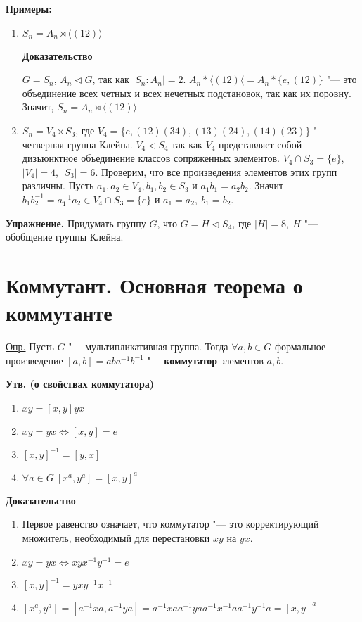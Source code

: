 \documentclass{article}
\begin{document}
\textbf{Примеры:}
\begin{enumerate}
	\item $S_n = A_n \rtimes \langle (1 2) \rangle$
	
	\textbf{Доказательство}
	
	$G = S_n$, $A_n \triangleleft G$, так как $|S_n:A_n| = 2$. $A_n*\langle (1 2) \langle = A_n*\{e, (1 2)\}$ "--- это объединение всех четных и всех нечетных подстановок, так как их поровну. Значит, $S_n = A_n \rtimes \langle (1 2) \rangle$
	
	\item $S_n = V_4 \rtimes S_3$, где $V_4 = \{e, (1 2)(3 4), (1 3)(2 4), (1 4)(2 3)\}$ "--- четверная группа Клейна. $V_4 \triangleleft S_4$ так как $V_4$ представляет собой дизъюнктное объединение классов сопряженных элементов.
	$V_4 \cap S_3 = \{e\}$, $|V_4| = 4$, $|S_3| = 6$. Проверим, что все произведения элементов этих групп различны. Пусть $a_1, a_2 \in V_4, b_1, b_2 \in S_3$ и $a_1b_1 = a_2b_2$. Значит $b_1b_2^{-1} = a_1^{-1}a_2 \in V_4 \cap S_3 = \{e\}$ и $a_1 = a_2, \  b_1 = b_2$.
\end{enumerate}

\vspace{10pt}

\textbf{Упражнение.} Придумать группу $G$, что $G = H \triangleleft S_4$, где $|H| = 8, \  H$ "--- обобщение группы Клейна.

\section{Коммутант. Основная теорема о коммутанте}

\underline{Опр.} Пусть $G$ "--- мультипликативная группа. Тогда $\forall a, b \in G$ формальное произведение $[a, b] = aba^{-1}b^{-1}$ "--- \textbf{коммутатор} элементов $a, b$.

\vspace{5pt}

\textbf{Утв. (о свойствах коммутатора)}
\begin{enumerate}
	\item $xy = [x, y]yx$
	\item $xy = yx \Leftrightarrow [x, y] = e$
	\item $[x, y]^{-1} = [y, x]$
	\item $\forall a \in G \  [x^a, y^a] = [x, y]^a$
\end{enumerate}

\textbf{Доказательство}
\begin{enumerate}
	\item Первое равенство означает, что коммутатор "--- это корректирующий множитель, необходимый для перестановки $xy$ на $yx$.
	\item $xy = yx \Leftrightarrow xyx^{-1}y^{-1} = e$
	\item $[x, y]^{-1} = yxy^{-1}x^{-1}$
	\item $[x^a, y^a] = [a^{-1}xa, a^{-1}ya] = a^{-1}xaa^{-1}yaa^{-1}x^{-1}aa^{-1}y^{-1}a = [x, y]^a$
\end{enumerate}
\end{document}
